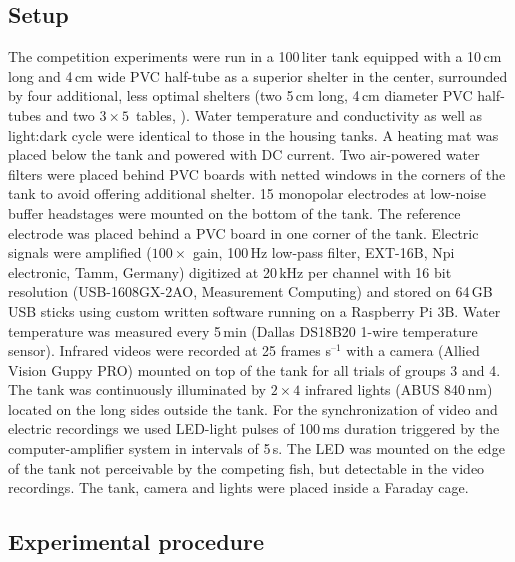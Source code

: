 \subsection{Setup}

The competition experiments were run in a 100\,liter tank equipped with a 10\,cm long and 4\,cm wide PVC half-tube as a superior shelter in the center, surrounded by four additional, less optimal shelters (two 5\,cm long, 4\,cm diameter PVC half-tubes and two $3\times 5$\,\centi\meter\squared{} tables, ). Water temperature and conductivity as well as light:dark cycle were identical to those in the housing tanks. A heating mat was placed below the tank and powered with DC current. Two air-powered water filters were placed behind PVC boards with netted windows in the corners of the tank to avoid offering additional shelter. 15 monopolar electrodes at low-noise buffer headstages were mounted on the bottom of the tank. The reference electrode was placed behind a PVC board in one corner of the tank. Electric signals were amplified ($100\times$ gain, 100\,Hz low-pass filter, EXT-16B, Npi electronic, Tamm, Germany) digitized at 20\,kHz per channel with 16 bit resolution (USB-1608GX-2AO, Measurement Computing) and stored on 64\,GB USB sticks using custom written software running on a Raspberry Pi 3B. Water temperature was measured every 5\,min (Dallas DS18B20 1-wire temperature sensor). Infrared videos were recorded at 25 frames s$^{–1}$ with a camera (Allied Vision Guppy PRO) mounted on top of the
tank for all trials of groups 3 and 4. The tank was continuously illuminated by $2\times 4$ infrared lights (ABUS 840\,nm) located on the long sides outside the tank. For the synchronization of video and electric recordings we used LED-light pulses of 100\,ms duration triggered by the computer-amplifier system in intervals of 5\,s. The LED was mounted on the edge of the tank not perceivable by the competing fish, but detectable in the video recordings. The tank, camera and lights were placed inside a Faraday cage.

\subsection{Experimental procedure}

